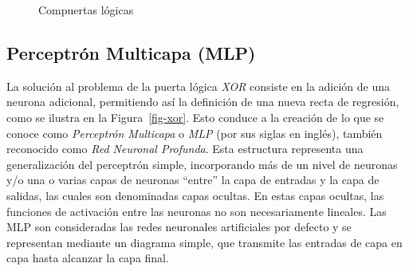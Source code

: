 \documentclass[
  us-letterpaper,
]{scrreprt}
\theoremstyle{definition}
\theoremstyle{plain}
\theoremstyle{plain}
\theoremstyle{definition}
\theoremstyle{remark}
\begin{document}
\begin{figure}
\begin{minipage}{0.33\linewidth}
{}

\subcaption{\label{fig-and}}

\end{minipage}%
%
\begin{minipage}{0.33\linewidth}


\subcaption{\label{fig-xor}}

\end{minipage}%

\caption{\label{fig-compuertas}Compuertas lógicas}

\end{figure}%

\subsection{Perceptrón Multicapa (MLP)}\label{sec-arqmlp}

La solución al problema de la puerta lógica \emph{XOR} consiste en la
adición de una neurona adicional, permitiendo así la definición de una
nueva recta de regresión, como se ilustra en la Figura~\ref{fig-xor}.
Esto conduce a la creación de lo que se conoce como \emph{Perceptrón
Multicapa} o \emph{MLP} (por sus siglas en inglés), también reconocido
como \emph{Red Neuronal Profunda}. Esta estructura representa una
generalización del perceptrón simple, incorporando más de un nivel de
neuronas y/o una o varias capas de neuronas ``entre'' la capa de
entradas y la capa de salidas, las cuales son denominadas capas ocultas.
En estas capas ocultas, las funciones de activación entre las neuronas
no son necesariamente lineales. Las MLP son consideradas las redes
neuronales artificiales por defecto y se representan mediante un
diagrama simple, que transmite las entradas de capa en capa hasta
alcanzar la capa final.
\end{document}
